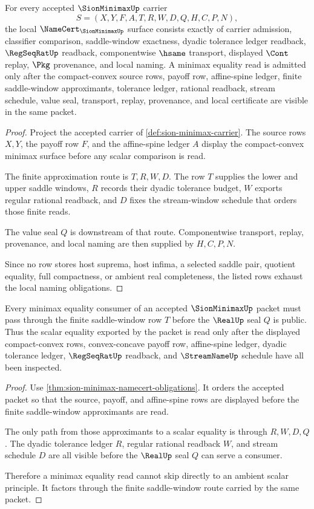 \begin{theorem}
\label{thm:sion-minimax-namecert-obligations}
For every accepted $\SionMinimaxUp$ carrier
$$
S=(X,Y,F,A,T,R,W,D,Q,H,C,P,N),
$$
the local $\NameCert_{\SionMinimaxUp}$ surface consists exactly of carrier
admission, classifier comparison, saddle-window exactness, dyadic tolerance
ledger readback, $\RegSeqRatUp$ readback, componentwise $\hsame$ transport,
displayed $\Cont$ replay, $\Pkg$ provenance, and local naming. A minimax
equality read is admitted only after the compact-convex source rows, payoff
row, affine-spine ledger, finite saddle-window approximants, tolerance ledger,
rational readback, stream schedule, value seal, transport, replay,
provenance, and local certificate are visible in the same packet.
\end{theorem}
\begin{proof}
Project the accepted carrier of
\autoref{def:sion-minimax-carrier}. The source rows $X,Y$, the payoff row
$F$, and the affine-spine ledger $A$ display the compact-convex minimax
surface before any scalar comparison is read.

The finite approximation route is $T,R,W,D$. The row $T$ supplies the lower
and upper saddle windows, $R$ records their dyadic tolerance budget, $W$
exports regular rational readback, and $D$ fixes the stream-window schedule
that orders those finite reads.

The value seal $Q$ is downstream of that route. Componentwise transport,
replay, provenance, and local naming are then supplied by $H,C,P,N$.

Since no row stores host suprema, host infima, a selected saddle pair, quotient
equality, full compactness, or ambient real completeness, the listed rows
exhaust the local naming obligations.
\end{proof}

\begin{theorem}
\label{thm:sion-minimax-finite-saddle-window}
Every minimax equality consumer of an accepted $\SionMinimaxUp$ packet must
pass through the finite saddle-window row $T$ before the $\RealUp$ seal $Q$ is
public. Thus the scalar equality exported by the packet is read only after the
displayed compact-convex rows, convex-concave payoff row, affine-spine ledger,
dyadic tolerance ledger, $\RegSeqRatUp$ readback, and $\StreamNameUp$ schedule
have all been inspected.
\end{theorem}
\begin{proof}
Use \autoref{thm:sion-minimax-namecert-obligations}. It orders the accepted
packet so that the source, payoff, and affine-spine rows are displayed before
the finite saddle-window approximants are read.

The only path from those approximants to a scalar equality is through
$R,W,D,Q$. The dyadic tolerance ledger $R$, regular rational readback $W$, and
stream schedule $D$ are all visible before the $\RealUp$ seal $Q$ can serve a
consumer.

Therefore a minimax equality read cannot skip directly to an ambient scalar
principle. It factors through the finite saddle-window route carried by the
same packet.
\end{proof}

